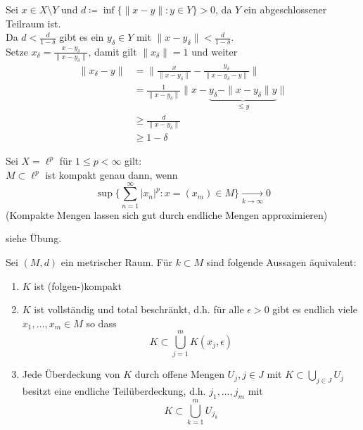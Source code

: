 \begin{beweis}
	Sei $x \in X \setminus Y$ und $d \coloneqq \inf \{ \| x - y \|: y \in Y \} > 0$, da $Y$ ein abgeschlossener Teilraum ist. \\
	Da $ d < \frac{d}{1 - \delta}$ gibt es ein $y_{\delta} \in Y$ mit $\| x - y_{\delta} \| < \frac{d}{1 -  \delta}$. \\ 
	Setze $x_{\delta} = \frac{x - y_{\delta}}{\| x - y_{\delta} \|}$, damit gilt $\| x_{\delta} \| = 1$ und weiter 
	\begin{align*}
		\| x_{\delta} - y \| & = \| \frac{x}{\| x - y_{\delta} \|} - \frac{y_\delta}{\| x - y_{\delta} - y\|} \|	\\
			& = \frac{1}{\| x - y_{\delta} \|} \| x - \underbrace{y_{\delta} - \| x - y_{\delta} \| y}_{\leq y} \| \\
			& \geq \frac{d}{\| x - y_{\delta} \|} \\
			& \geq 1 - \delta
	\end{align*}
\end{beweis}


\begin{beispiel} \label{bsp:6.4}
	Sei $X = \ell^{p}$ für $1 \leq p < \infty$ gilt: \\
	$M \subset \ell^{p}$ ist kompakt genau dann, wenn
	\[ \sup \{ \sum_{ n = 1}^{\infty} |x_{n}|^{p} : x = (x_{m}) \in M \} \xrightarrow[k \rightarrow \infty]{} 0 \]	
	(Kompakte Mengen lassen sich gut durch endliche Mengen approximieren)
\end{beispiel}

\begin{beweis}
	siehe Übung.	
\end{beweis}


\begin{satz} \label{satz:6.5}
	Sei $(M, d)$ ein metrischer Raum. Für $k \subset M$ sind folgende Aussagen äquivalent:
	\begin{enumerate}[label=\alph*\upshape)]
		\label{satz:6.5a}
		\item $K$ ist (folgen-)kompakt 
		\label{satz:6.5b}
		\item $K$ ist vollständig und total beschränkt, d.h. für alle $\epsilon > 0$ gibt es endlich viele $x_{1}, \dotsc, x_{m} \in M$ so dass
			\[ K \subset \bigcup_{j = 1}^{m} K(x_{j}, \epsilon) \]
		\label{satz:6.5c}
		\item Jede Überdeckung von $K$ durch offene Mengen $U_{j}, j \in J$ mit $K \subset \bigcup_{j \in J} U_{j}$ besitzt eine endliche Teilüberdeckung, d.h. $j_{1}, \dotsc, j_{m}$ mit
			\[ K \subset \bigcup_{k = 1}^{m} U_{j_{k}} \]
	\end{enumerate}
\end{satz}

